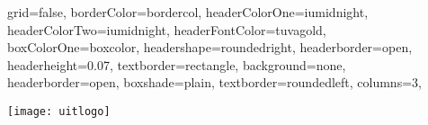 \documentclass[fontscale=0.35,landscape,paperwidth=841mm,paperheight=1189mm]{baposter}  %
\begin{document}
	\setlength{\pdfpageheight}{\paperheight}
	\setlength{\pdfpagewidth}{\paperwidth}


	\begin{poster}{
		grid=false,
		borderColor=bordercol,
		headerColorOne=iumidnight,
		headerColorTwo=iumidnight,
		headerFontColor=tuvagold,
		boxColorOne=boxcolor,
		headershape=roundedright,
		headerborder=open,
		headerheight=0.07\textheight,
		textborder=rectangle,
		background=none,
		headerborder=open,
		boxshade=plain,
		textborder=roundedleft,
		columns=3,
	}{ %
		\setlength\fboxsep{0.5em}
		\setlength\fboxrule{0pt}
		\texttt{[image: uitlogo]}\hspace{1em}

}
\end{poster}
\end{document}
